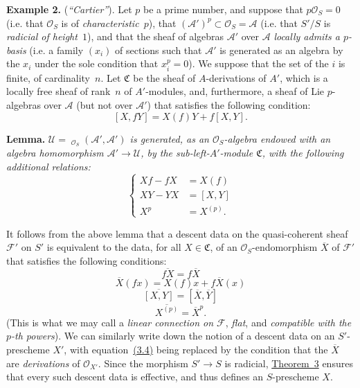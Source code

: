 \documentclass{article}
\newenvironment{itenv}[1]
  {\phantomsection\par\medskip\noindent\textbf{#1.}\itshape}
  {\medskip}
\newenvironment{rmenv}[1]
  {\phantomsection\par\medskip\noindent\textbf{#1.}\rmfamily}
  {\medskip}
\newcommand{\scr}[1]{{\mathscr{#1}}}
\renewcommand{\cal}[1]{{\mathcal{#1}}}
\newcommand{\fk}[1]{{\mathfrak{#1}}}
\DeclareMathOperator{\Hom}{Hom}
\DeclareMathOperator{\shHom}{\underline{\Hom}}
\newcommand{\oldpage}[1]{\marginpar{\footnotesize$\Big\vert$ \textit{p.~#1}}}
\begin{document}
\begin{rmenv}{Example 2}
\label{example:B.3(2)}
  (\emph{``Cartier''}).
  Let $p$ be a prime number, and suppose that $p\scr{O}_S=0$ (i.e. that $\scr{O}_S$ is of \emph{characteristic~$p$}), that $(\scr{A}')^p\subset\scr{O}_S=\scr{A}$ (i.e. that $S'/S$ is \emph{radicial of height~$1$}), and that the sheaf of algebras $\scr{A}'$ over $\scr{A}$ \emph{locally admits a $p$-basis} (i.e. a family $(x_i)$ of sections such that $\scr{A}'$ is generated as an algebra by the $x_i$ under the sole condition that $x_i^p=0$).
  We suppose that the set of the $i$ is finite, of cardinality~$n$.
  Let $\fk{C}$ be the sheaf of $A$-derivations of $A'$, which is a locally free sheaf of rank~$n$ of $A'$-modules, and, furthermore, a sheaf of Lie $p$-algebras over $\scr{A}$ (but not over $\scr{A}'$) that satisfies the following condition:
  \[
  \label{equation:B.3.5}
    [X,fY] = X(f)Y + f[X,Y].
  \tag{3.5}
  \]
\end{rmenv}

\begin{itenv}{Lemma}
  $\scr{U}=\shHom_{\scr{O}_S}(\scr{A}',\scr{A}')$ is generated, as an $\scr{O}_S$-algebra endowed with an algebra homomorphism $\scr{A}'\to\scr{U}$, by the sub-left-$A'$-module $\fk{C}$, with the following additional relations:
  \[
  \label{equation:B.3.6}
    \begin{cases}
      Xf-fX &= X(f)
    \\XY-YX &= [X,Y]
    \\X^p &= X^{(p)}.
    \end{cases}
  \tag{3.6}
  \]
\end{itenv}

It follows from the above lemma that a descent data on the quasi-coherent sheaf $\cal{F}'$ on $S'$ is equivalent to the data, for all $X\in\fk{C}$, of an $\scr{O}_S$-endomorphism $\overline{X}$ of $\cal{F}'$ that satisfies the following conditions:
\[
\label{equation:B.3.7}
  \overline{fX} = f\overline{X}
\tag{3.7}
\]
\[
\label{equation:B.3.8}
  \overline{X}(fx) = X(f)x + f\overline{X}(x)
\tag{3.8}
\]
\[
\label{equation:B.3.9}
  \overline{[X,Y]} = [\overline{X},\overline{Y}]
\tag{3.9}
\]
\[
\label{equation:B.3.10}
  \overline{X^{(p)}} = \overline{X}^p.
\tag{3.10}
\]
(This is what we may call a \emph{linear connection on $\cal{F}$}, \emph{flat}, and \emph{compatible with the $p$-th powers}).
We can similarly write down the notion of a descent data on an $S'$-prescheme $X'$, with equation~\hyperref[equation:B.3.4]{(3.4)} being replaced by the condition that the $\overline{X}$ are \emph{derivations} of $\scr{O}_{X'}$.
Since the morphism $S'\to S$ is radicial, \hyperref[theorem:B.1(3)]{Theorem~3} ensures that every such descent data is
\oldpage{190-24}
effective, and thus defines an $S$-prescheme $X$.
\end{document}
